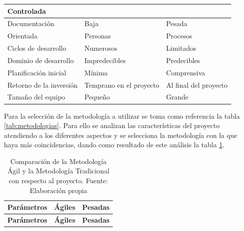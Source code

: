 {\begin{longtable}{|p{5cm}|p{5cm}|p{5cm}|}
		Controlada \\ 
    	\hline
    	Documentación & Baja & Pesada \\ 
    	\hline
    	\rowcolor[HTML]{EDEBF1}
    	Orientada & Personas & Procesos \\ 
    	\hline
    	Ciclos de desarrollo & Numerosos & Limitados \\ 
    	\hline
    	\rowcolor[HTML]{EDEBF1}
    	Dominio de desarrollo & Impredecibles & Predecibles \\ 
    	\hline
    	Planificación inicial & Mínima & Comprensiva \\ 
    	\hline
    	\rowcolor[HTML]{EDEBF1}
    	Retorno de la inversión & Temprano en el proyecto & Al final del proyecto \\ 
    	\hline
    	Tamaño del equipo & Pequeño & Grande \\ 
    	\hline
    \end{longtable}
    
    Para la selección de la metodología a utilizar se toma como referencia la tabla \ref{tab:metodologias}. Para ello se analizan las características del proyecto atendiendo a los diferentes aspectos y se selecciona la metodología con la que haya más coincidencias, dando como resultado de este análisis la tabla \ref{tab:resultado}.
    
    \begin{longtable}{|p{7cm}|p{2cm}|p{2cm}|}
    	\caption{Comparación de la Metodología Ágil y la Metodología Tradicional con respecto al proyecto. Fuente: Elaboración propia}
    	\label{tab:resultado} \\
    	
    	\hline
    	\rowcolor[HTML]{CBCEFB} 
    	\textbf{Parámetros} & \textbf{Ágiles} & \textbf{Pesadas} \\
    	\hline
    	\endfirsthead
    	
    	\hline
    	\rowcolor[HTML]{CBCEFB} 
    	\textbf{Parámetros} & \textbf{Ágiles} & \textbf{Pesadas} \\
    	\hline
    	\endhead
    	

\end{longtable}}
